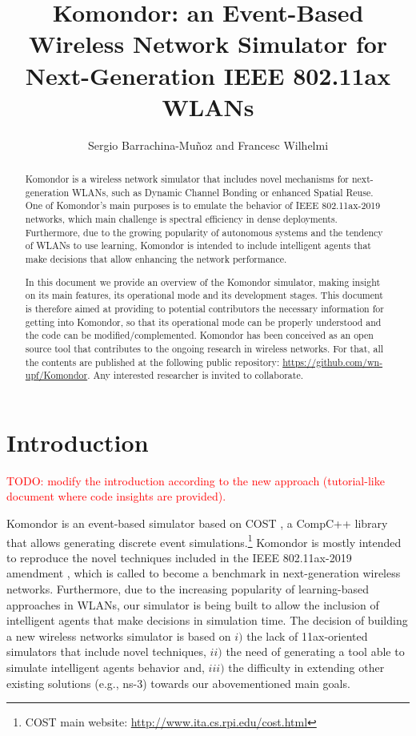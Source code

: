 \documentclass[a4paper]{article}
\title{Komondor: an Event-Based Wireless Network Simulator for Next-Generation IEEE 802.11ax WLANs}
\author{Sergio Barrachina-Mu\~noz and Francesc Wilhelmi}
\begin{document}
\maketitle

\begin{abstract}
Komondor is a wireless network simulator that includes novel mechanisms for next-generation WLANs, such as Dynamic Channel Bonding or enhanced Spatial Reuse. One of Komondor's main purposes is to emulate the behavior of IEEE 802.11ax-2019 networks, which main challenge is spectral efficiency in dense deployments. Furthermore, due to the growing popularity of autonomous systems and the tendency of WLANs to use learning, Komondor is intended to include intelligent agents that make decisions that allow enhancing the network performance. 

In this document we provide an overview of the Komondor simulator, making insight on its main features, its operational mode and its development stages. This document is therefore aimed at providing to potential contributors the necessary information for getting into Komondor, so that its operational mode can be properly understood and the code can be modified/complemented. Komondor has been conceived as an open source tool that contributes to the ongoing research in wireless networks. For that, all the contents are published at the following public repository: \url{https://github.com/wn-upf/Komondor}. Any interested researcher is invited to collaborate.

\end{abstract}

\tableofcontents

\listoffigures

\listoftables

\section{Introduction}
\label{section:introduction}

\textcolor{red}{TODO: modify the introduction according to the new approach (tutorial-like document where code insights are provided).}

Komondor \cite{barrachina2017komondor} is an event-based simulator based on COST \cite{chen2002reusing}, a CompC++ library that allows generating discrete event simulations.\footnote{COST main website: \url{http://www.ita.cs.rpi.edu/cost.html}} Komondor is mostly intended to reproduce the novel techniques included in the IEEE 802.11ax-2019 amendment \cite{tgax2017draft}, which is called to become a benchmark in next-generation wireless networks. Furthermore, due to the increasing popularity of learning-based approaches in WLANs, our simulator is being built to allow the inclusion of intelligent agents that make decisions in simulation time. The decision of building a new wireless networks simulator is based on $i)$ the lack of 11ax-oriented simulators that include novel techniques, $ii)$ the need of generating a tool able to simulate intelligent agents behavior and, $iii)$ the difficulty in extending other existing solutions (e.g., ns-3) towards our abovementioned main goals. 
	
\end{document}
